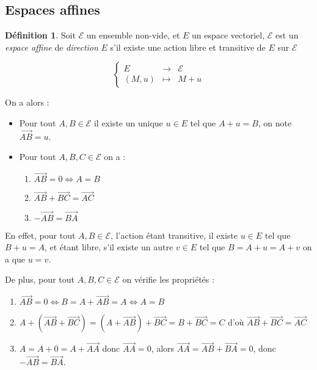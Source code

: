 \documentclass[]{article}
\theoremstyle{remark}
\theoremstyle{definition}
\newtheorem{mydef}{Définition}
\newcommand{\anonfunc}[4]{
\left\{ \begin{array}{lcl}
	#1 & \longrightarrow & #2 \\
	#3 & \longmapsto & #4
\end{array}
\right.
}
\begin{document}
\subsection{Espaces affines}

\begin{mydef}
	Soit $\mathcal{E}$ un ensemble non-vide, et $E$ un espace vectoriel, $\mathcal{E}$ est un \textit{espace affine} de \textit{direction} $E$ s'il existe une action libre et transitive de $E$ sur $\mathcal{E}$
	
	$$\anonfunc{E}{\mathcal{E}}{(M, u)}{M + u}$$

	On a alors :

	\begin{itemize}
		\item Pour tout $A, B \in \mathcal{E}$ il existe un unique $u \in E$ tel que $A + u = B$, on note $\overrightarrow{AB} = u$.
		
		\item Pour tout $A, B, C \in \mathcal{E}$ on a :
		\begin{enumerate}
			\item $\overrightarrow{AB} = 0 \Leftrightarrow A = B$
			\item $\overrightarrow{AB}+\overrightarrow{BC} = \overrightarrow{AC}$
			\item $-\overrightarrow{AB} = \overrightarrow{BA}$
		\end{enumerate} 
	\end{itemize}
\end{mydef}

En effet, pour tout $A, B \in \mathcal{E}$, l'action étant transitive, il existe $u \in E$ tel que $B + u = A$, et étant libre, s'il existe un autre $v \in E$ tel que $B = A + u = A + v$ on a que $u = v$.

De plus, pour tout $A, B, C \in \mathcal{E}$ on vérifie les propriétés :
\begin{enumerate}
	\item $\overrightarrow{AB} = 0 \Longleftrightarrow B = A + \overrightarrow{AB} = A \Longleftrightarrow A = B$
	\item $A + (\overrightarrow{AB} + \overrightarrow{BC}) = (A + \overrightarrow{AB}) + \overrightarrow{BC} = B + \overrightarrow{BC} = C$ d'où $\overrightarrow{AB} + \overrightarrow{BC} = \overrightarrow{AC}$
	\item $A = A + 0 = A + \overrightarrow{AA}$ donc $\overrightarrow{AA} = 0$, alors $\overrightarrow{AA} = \overrightarrow{AB} + \overrightarrow{BA} = 0$, donc $-\overrightarrow{AB} = \overrightarrow{BA}$.
\end{enumerate}
\end{document}
